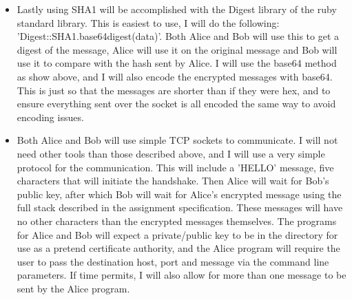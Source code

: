 \documentclass[letterpaper,12pt]{article}
\begin{document}
\begin{itemize}
    \item Lastly using SHA1 will be accomplished with the Digest library of the ruby standard library. This is easiest to use, I will do the following: 'Digest::SHA1.base64digest(data)'. Both Alice and Bob will use this to get a digest of the message, Alice will use it on the original message and Bob will use it to compare with the hash sent by Alice. I will use the base64 method as show above, and I will also encode the encrypted messages with base64. This is just so that the messages are shorter than if they were hex, and to ensure everything sent over the socket is all encoded the same way to avoid encoding issues.

    \item Both Alice and Bob will use simple TCP sockets to communicate. I will not need other tools than those described above, and I will use a very simple protocol for the communication. This will include a 'HELLO' message, five characters that will initiate the handshake. Then Alice will wait for Bob's public key, after which Bob will wait for Alice's encrypted message using the full stack described in the assignment specification. These messages will have no other characters than the encrypted messages themselves. The programs for Alice and Bob will expect a private/public key to be in the directory for use as a pretend certificate authority, and the Alice program will require the user to pass the destination host, port and message via the command line parameters. If time permits, I will also allow for more than one message to be sent by the Alice program.
        
\end{itemize}
\end{document}
